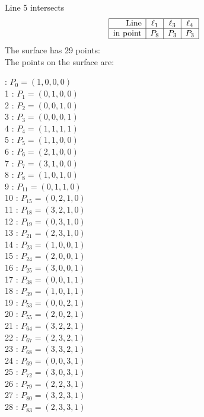 \documentclass{article}
\begin{document}
{$$$$
Line 5 intersects 
$$
\begin{array}{|r*{3}{|c}|}
\hline
\mbox{Line}  & \ell_{1} & \ell_{3} & \ell_{4}\\
\hline
\mbox{in point}  & P_{8} & P_{3} & P_{3}\\
\hline
\end{array}
$$
The surface has 29 points:\\
The points on the surface are:\\
\begin{multicols}{3}
 : $P_{0}=( 1, 0, 0, 0 )$\\
1 : $P_{1}=( 0, 1, 0, 0 )$\\
2 : $P_{2}=( 0, 0, 1, 0 )$\\
3 : $P_{3}=( 0, 0, 0, 1 )$\\
4 : $P_{4}=( 1, 1, 1, 1 )$\\
5 : $P_{5}=( 1, 1, 0, 0 )$\\
6 : $P_{6}=( 2, 1, 0, 0 )$\\
7 : $P_{7}=( 3, 1, 0, 0 )$\\
8 : $P_{8}=( 1, 0, 1, 0 )$\\
9 : $P_{11}=( 0, 1, 1, 0 )$\\
10 : $P_{15}=( 0, 2, 1, 0 )$\\
11 : $P_{18}=( 3, 2, 1, 0 )$\\
12 : $P_{19}=( 0, 3, 1, 0 )$\\
13 : $P_{21}=( 2, 3, 1, 0 )$\\
14 : $P_{23}=( 1, 0, 0, 1 )$\\
15 : $P_{24}=( 2, 0, 0, 1 )$\\
16 : $P_{25}=( 3, 0, 0, 1 )$\\
17 : $P_{38}=( 0, 0, 1, 1 )$\\
18 : $P_{39}=( 1, 0, 1, 1 )$\\
19 : $P_{53}=( 0, 0, 2, 1 )$\\
20 : $P_{55}=( 2, 0, 2, 1 )$\\
21 : $P_{64}=( 3, 2, 2, 1 )$\\
22 : $P_{67}=( 2, 3, 2, 1 )$\\
23 : $P_{68}=( 3, 3, 2, 1 )$\\
24 : $P_{69}=( 0, 0, 3, 1 )$\\
25 : $P_{72}=( 3, 0, 3, 1 )$\\
26 : $P_{79}=( 2, 2, 3, 1 )$\\
27 : $P_{80}=( 3, 2, 3, 1 )$\\
28 : $P_{83}=( 2, 3, 3, 1 )$\\
\end{multicols}


}
\end{document}
